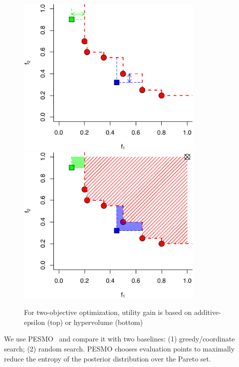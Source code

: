 \begin{figure}
  \centering
  \includegraphics[width=0.8\textwidth]{figures/serving-bo-2d-1.pdf} \\
  \includegraphics[width=0.8\textwidth]{figures/serving-bo-2d-2.pdf}
  \caption{For two-objective optimization, utility gain is based on
    additive-epsilon (top) or hypervolume (bottom)~\cite{binoisgpareto}}
\end{figure}

We use PESMO~\cite{hernandez2016predictive} and compare it with two baselines:
(1) greedy/coordinate search; (2) random search. PESMO chooses evaluation points
to maximally reduce the entropy of the posterior distribution over the Pareto
set.

